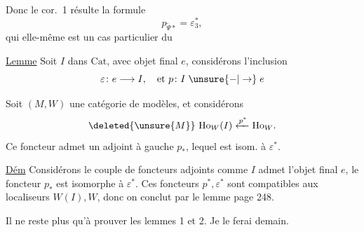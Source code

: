 
Donc le cor.~1 résulte  la formule
\[
p_{\widetilde\Psi*}=\varepsilon_3^*,
\]
qui  elle-même est un cas particulier du

\uline{Lemme} Soit $I$ dans $\mathrm{Cat}$, avec objet final $e$, considérons l'inclusion
\[
\varepsilon\colon e\longrightarrow I,\quad\text{et }p\colon I\mathrel{\unsure{-|\to}}e
\]

Soit $(M,W)$ une catégorie de modèles, et considérons
\[
\deleted{\unsure{M}}\ \mathrm{Ho}_W(I)\xleftarrow{p^*}\mathrm{Ho}_W .
\]
Ce foncteur admet un adjoint à gauche $p_*$, lequel est isom. à $\varepsilon^*$.

\uline{Dém} Considérons le couple de foncteurs adjoints
comme $I$ admet  l'objet final $e$, le foncteur $p_*$ est isomorphe à $\varepsilon^*$. Ces foncteurs $p^*,\varepsilon^*$ sont compatibles aux localiseurs\unsure{,|} $W(I),W$, donc on conclut par le lemme page 248.

Il ne reste plus qu'à prouver les lemmes 1 et 2. Je le ferai demain.
